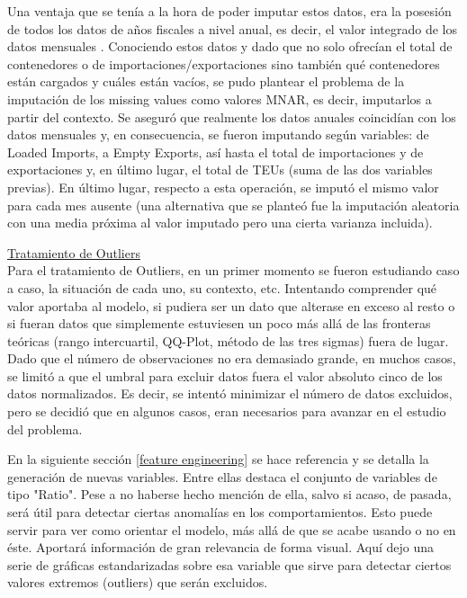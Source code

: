\documentclass[12pt]{article}
\begin{document}
		Una ventaja que se tenía a la hora de poder imputar estos datos, era la posesión de todos los datos de años fiscales a nivel anual, es decir, el valor integrado de los datos mensuales \cite{Preliminary_Waterborne_Commerce_Chart_2024}. Conociendo estos datos y dado que no solo ofrecían el total de contenedores o de importaciones/exportaciones sino también qué contenedores están cargados y cuáles están vacíos, se pudo plantear el problema de la imputación de los missing values como valores MNAR, es decir, imputarlos a partir del contexto. Se aseguró que realmente los datos anuales coincidían con los datos mensuales y, en consecuencia, se fueron imputando según variables: de Loaded Imports, a Empty Exports, así hasta el total de importaciones y de exportaciones y, en último lugar, el total de TEUs (suma de las dos variables previas). En último lugar, respecto a esta operación, se imputó el mismo valor para cada mes ausente (una alternativa que se planteó fue la imputación aleatoria con una media próxima al valor imputado pero una cierta varianza incluida).
		
		
		\underline{Tratamiento de Outliers}\\
		Para el tratamiento de Outliers, en un primer momento se fueron estudiando caso a caso, la situación de cada uno, su contexto, etc. Intentando comprender qué valor aportaba al modelo, si pudiera ser un dato que alterase en exceso al resto o si fueran datos que simplemente estuviesen un poco más allá de las fronteras teóricas (rango intercuartil, QQ-Plot, método de las tres sigmas) fuera de lugar. Dado que el número de observaciones no era demasiado grande, en muchos casos, se limitó a que el umbral para excluir datos fuera el valor absoluto cinco de los datos normalizados. Es decir, se intentó minimizar el número de datos excluidos, pero se decidió que en algunos casos, eran necesarios para avanzar en el estudio del problema.\
		
		En la siguiente sección \ref{feature engineering} se hace referencia y se detalla la generación de nuevas variables. Entre ellas destaca el conjunto de variables de tipo "Ratio". Pese a no haberse hecho mención de ella, salvo si acaso, de pasada, será útil para detectar ciertas anomalías en los comportamientos. Esto puede servir para ver como orientar el modelo, más allá de que se acabe usando o no en éste. Aportará información de gran relevancia de forma visual. Aquí dejo una serie de gráficas estandarizadas sobre esa variable que sirve para detectar ciertos valores extremos (outliers) que serán excluidos.
		
\end{document}
